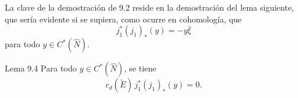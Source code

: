 La clave de la demostración de 9.2 reside en la demostración del lema siguiente, que sería evidente si se supiera, como ocurre en cohomología, que
\[
j_1^*(j_1)_*(y)=-y\bar\xi
\]
para todo $y\in C^*(\widehat N)$.

\begin{statement}{Lema 9.4}
Para todo $y\in C^*(\widehat N)$, se tiene
\[
c_d(\check E)\,j_1^*(j_1)_*(y)=0.
\]
\end{statement}
